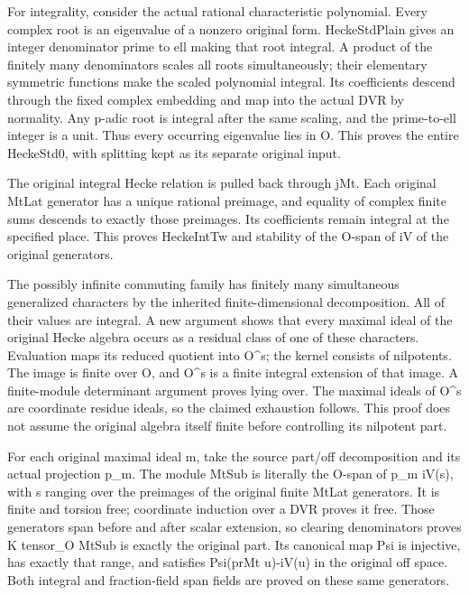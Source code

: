 For integrality, consider the actual rational characteristic polynomial. Every complex root is an eigenvalue of a nonzero original form. HeckeStdPlain gives an integer denominator prime to ell making that root integral. A product of the finitely many denominators scales all roots simultaneously; their elementary symmetric functions make the scaled polynomial integral. Its coefficients descend through the fixed complex embedding and map into the actual DVR by normality. Any p-adic root is integral after the same scaling, and the prime-to-ell integer is a unit. Thus every occurring eigenvalue lies in O. This proves the entire HeckeStd0, with splitting kept as its separate original input.

The original integral Hecke relation is pulled back through jMt. Each original MtLat generator has a unique rational preimage, and equality of complex finite sums descends to exactly those preimages. Its coefficients remain integral at the specified place. This proves HeckeIntTw and stability of the O-span of iV of the original generators.

The possibly infinite commuting family has finitely many simultaneous generalized characters by the inherited finite-dimensional decomposition. All of their values are integral. A new argument shows that every maximal ideal of the original Hecke algebra occurs as a residual class of one of these characters. Evaluation maps its reduced quotient into O\textasciicircum{}s; the kernel consists of nilpotents. The image is finite over O, and O\textasciicircum{}s is a finite integral extension of that image. A finite-module determinant argument proves lying over. The maximal ideals of O\textasciicircum{}s are coordinate residue ideals, so the claimed exhaustion follows. This proof does not assume the original algebra itself finite before controlling its nilpotent part.

For each original maximal ideal m, take the source part/\allowbreak{}off decomposition and its actual projection p\_\allowbreak{}m. The module MtSub is literally the O-span of p\_\allowbreak{}m iV(s), with s ranging over the preimages of the original finite MtLat generators. It is finite and torsion free; coordinate induction over a DVR proves it free. Those generators span before and after scalar extension, so clearing denominators proves K tensor\_\allowbreak{}O MtSub is exactly the original part. Its canonical map Psi is injective, has exactly that range, and satisfies Psi(prMt u)-iV(u) in the original off space. Both integral and fraction-field span fields are proved on these same generators.

